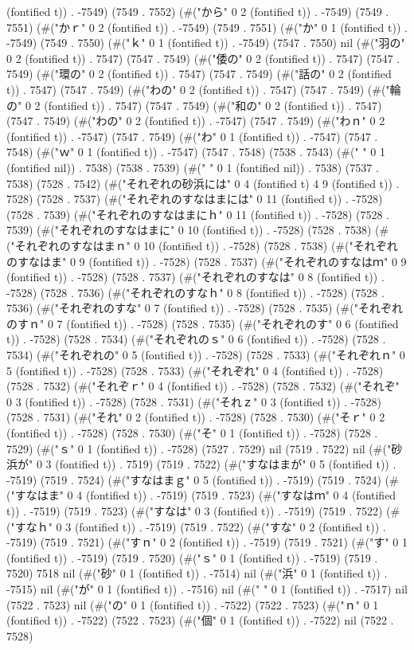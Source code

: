 (fontified t)) . -7549) (7549 . 7552) (#("から" 0 2 (fontified t)) . -7549) (7549 . 7551) (#("かｒ" 0 2 (fontified t)) . -7549) (7549 . 7551) (#("か" 0 1 (fontified t)) . -7549) (7549 . 7550) (#("ｋ" 0 1 (fontified t)) . -7549) (7547 . 7550) nil (#("羽の" 0 2 (fontified t)) . 7547) (7547 . 7549) (#("倭の" 0 2 (fontified t)) . 7547) (7547 . 7549) (#("環の" 0 2 (fontified t)) . 7547) (7547 . 7549) (#("話の" 0 2 (fontified t)) . 7547) (7547 . 7549) (#("わの" 0 2 (fontified t)) . 7547) (7547 . 7549) (#("輪の" 0 2 (fontified t)) . 7547) (7547 . 7549) (#("和の" 0 2 (fontified t)) . 7547) (7547 . 7549) (#("わの" 0 2 (fontified t)) . -7547) (7547 . 7549) (#("わｎ" 0 2 (fontified t)) . -7547) (7547 . 7549) (#("わ" 0 1 (fontified t)) . -7547) (7547 . 7548) (#("ｗ" 0 1 (fontified t)) . -7547) (7547 . 7548) (7538 . 7543) (#(" " 0 1 (fontified nil)) . 7538) (7538 . 7539) (#(" " 0 1 (fontified nil)) . 7538) (7537 . 7538) (7528 . 7542) (#("それぞれの砂浜には" 0 4 (fontified t) 4 9 (fontified t)) . 7528) (7528 . 7537) (#("それぞれのすなはまには" 0 11 (fontified t)) . -7528) (7528 . 7539) (#("それぞれのすなはまにｈ" 0 11 (fontified t)) . -7528) (7528 . 7539) (#("それぞれのすなはまに" 0 10 (fontified t)) . -7528) (7528 . 7538) (#("それぞれのすなはまｎ" 0 10 (fontified t)) . -7528) (7528 . 7538) (#("それぞれのすなはま" 0 9 (fontified t)) . -7528) (7528 . 7537) (#("それぞれのすなはｍ" 0 9 (fontified t)) . -7528) (7528 . 7537) (#("それぞれのすなは" 0 8 (fontified t)) . -7528) (7528 . 7536) (#("それぞれのすなｈ" 0 8 (fontified t)) . -7528) (7528 . 7536) (#("それぞれのすな" 0 7 (fontified t)) . -7528) (7528 . 7535) (#("それぞれのすｎ" 0 7 (fontified t)) . -7528) (7528 . 7535) (#("それぞれのす" 0 6 (fontified t)) . -7528) (7528 . 7534) (#("それぞれのｓ" 0 6 (fontified t)) . -7528) (7528 . 7534) (#("それぞれの" 0 5 (fontified t)) . -7528) (7528 . 7533) (#("それぞれｎ" 0 5 (fontified t)) . -7528) (7528 . 7533) (#("それぞれ" 0 4 (fontified t)) . -7528) (7528 . 7532) (#("それぞｒ" 0 4 (fontified t)) . -7528) (7528 . 7532) (#("それぞ" 0 3 (fontified t)) . -7528) (7528 . 7531) (#("それｚ" 0 3 (fontified t)) . -7528) (7528 . 7531) (#("それ" 0 2 (fontified t)) . -7528) (7528 . 7530) (#("そｒ" 0 2 (fontified t)) . -7528) (7528 . 7530) (#("そ" 0 1 (fontified t)) . -7528) (7528 . 7529) (#("ｓ" 0 1 (fontified t)) . -7528) (7527 . 7529) nil (7519 . 7522) nil (#("砂浜が" 0 3 (fontified t)) . 7519) (7519 . 7522) (#("すなはまが" 0 5 (fontified t)) . -7519) (7519 . 7524) (#("すなはまｇ" 0 5 (fontified t)) . -7519) (7519 . 7524) (#("すなはま" 0 4 (fontified t)) . -7519) (7519 . 7523) (#("すなはｍ" 0 4 (fontified t)) . -7519) (7519 . 7523) (#("すなは" 0 3 (fontified t)) . -7519) (7519 . 7522) (#("すなｈ" 0 3 (fontified t)) . -7519) (7519 . 7522) (#("すな" 0 2 (fontified t)) . -7519) (7519 . 7521) (#("すｎ" 0 2 (fontified t)) . -7519) (7519 . 7521) (#("す" 0 1 (fontified t)) . -7519) (7519 . 7520) (#("ｓ" 0 1 (fontified t)) . -7519) (7519 . 7520) 7518 nil (#("砂" 0 1 (fontified t)) . -7514) nil (#("浜" 0 1 (fontified t)) . -7515) nil (#("が" 0 1 (fontified t)) . -7516) nil (#(" " 0 1 (fontified t)) . -7517) nil (7522 . 7523) nil (#("の" 0 1 (fontified t)) . -7522) (7522 . 7523) (#("ｎ" 0 1 (fontified t)) . -7522) (7522 . 7523) (#("個" 0 1 (fontified t)) . -7522) nil (7522 . 7528) 
